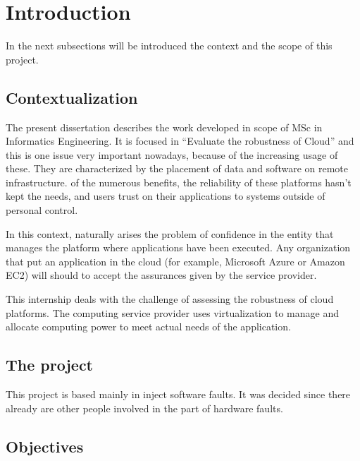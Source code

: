 \newpage
\section{Introduction}

In the next subsections will be introduced the context and the scope of this project.

\subsection{Contextualization}
The present dissertation describes the work developed in scope of MSc in Informatics Engineering. It is focused in ``Evaluate the robustness of Cloud'' and this is one issue very important nowadays, because of the increasing usage of these.
They are characterized by the placement of data and software on remote infrastructure.  of the numerous benefits, the reliability of these platforms hasn't kept the needs, and users trust on their applications to systems outside of personal control.

In this context, naturally arises the problem of confidence in the entity that manages the platform where applications have been executed. Any organization that put an application in the cloud (for example, Microsoft Azure or Amazon EC2) will should to accept the assurances given by the service provider.

This internship deals with the challenge of assessing the robustness of cloud platforms. The computing service provider uses virtualization to manage and allocate computing power to meet actual needs of the application. 




\subsection{The project}

This project is based mainly in inject software faults. It was decided since there already are other people involved in the part of hardware faults.

\subsection{Objectives}

